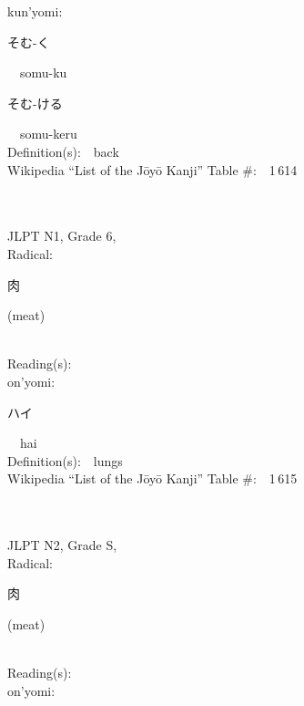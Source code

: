 \begin{multicols}{2}
{\hspace*{1em}}kun'yomi:\ \ \\
{\hspace*{2em}}{\begin{CJK}{UTF8}{min} そむ-く \end{CJK}}\ \ somu-ku\ \ \\
{\hspace*{2em}}{\begin{CJK}{UTF8}{min} そむ-ける \end{CJK}}\ \ somu-keru\ \ \\
Definition(s):\ \ back \\
Wikipedia ``List of the J\=oy\=o Kanji'' Table \#:\ \ 1\,614 \\
\ \ \\
{\fontsize{34pt}{40pt}  }\ \ \\  %
{JLPT N1, Grade 6, \\Radical:\ \ {\begin{CJK}{UTF8}{min} 肉 \end{CJK}} (meat) } \\
Reading(s):\ \ \\
{\hspace*{1em}}on'yomi:\ \ \\
{\hspace*{2em}}{\begin{CJK}{UTF8}{min} ハイ \end{CJK}}\ \ hai\ \ \\
Definition(s):\ \ lungs \\
Wikipedia ``List of the J\=oy\=o Kanji'' Table \#:\ \ 1\,615 \\
\ \ \\
{\fontsize{34pt}{40pt}  }\ \ \\  %
{JLPT N2, Grade S, \\Radical:\ \ {\begin{CJK}{UTF8}{min} 肉 \end{CJK}} (meat) } \\
Reading(s):\ \ \\
{\hspace*{1em}}on'yomi:\ \ \\

\end{multicols}
